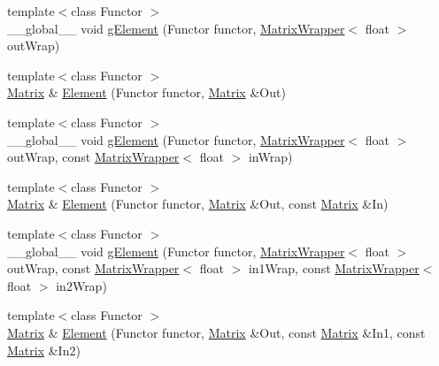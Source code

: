 \begin{DoxyCompactItemize}
\item 
{\footnotesize template$<$class Functor $>$ }\\\+\_\+\+\_\+global\+\_\+\+\_\+ void \hyperlink{namespaceamunmt_1_1GPU_1_1mblas_a2af92dc8b21ca5e91d449759338b8c2c}{g\+Element} (Functor functor, \hyperlink{classamunmt_1_1GPU_1_1mblas_1_1MatrixWrapper}{Matrix\+Wrapper}$<$ float $>$ out\+Wrap)
\item 
{\footnotesize template$<$class Functor $>$ }\\\hyperlink{namespaceamunmt_1_1GPU_1_1mblas_ab67821a8254de53e45a623cf73c0aef6}{Matrix} \& \hyperlink{namespaceamunmt_1_1GPU_1_1mblas_adc0a1bee5e001b28e10bff88e940b284}{Element} (Functor functor, \hyperlink{namespaceamunmt_1_1GPU_1_1mblas_ab67821a8254de53e45a623cf73c0aef6}{Matrix} \&Out)
\item 
{\footnotesize template$<$class Functor $>$ }\\\+\_\+\+\_\+global\+\_\+\+\_\+ void \hyperlink{namespaceamunmt_1_1GPU_1_1mblas_a0712a4ff2aa70bb93b88666856ff3f13}{g\+Element} (Functor functor, \hyperlink{classamunmt_1_1GPU_1_1mblas_1_1MatrixWrapper}{Matrix\+Wrapper}$<$ float $>$ out\+Wrap, const \hyperlink{classamunmt_1_1GPU_1_1mblas_1_1MatrixWrapper}{Matrix\+Wrapper}$<$ float $>$ in\+Wrap)
\item 
{\footnotesize template$<$class Functor $>$ }\\\hyperlink{namespaceamunmt_1_1GPU_1_1mblas_ab67821a8254de53e45a623cf73c0aef6}{Matrix} \& \hyperlink{namespaceamunmt_1_1GPU_1_1mblas_a138142180375dfb251db78a6a377d8fe}{Element} (Functor functor, \hyperlink{namespaceamunmt_1_1GPU_1_1mblas_ab67821a8254de53e45a623cf73c0aef6}{Matrix} \&Out, const \hyperlink{namespaceamunmt_1_1GPU_1_1mblas_ab67821a8254de53e45a623cf73c0aef6}{Matrix} \&In)
\item 
{\footnotesize template$<$class Functor $>$ }\\\+\_\+\+\_\+global\+\_\+\+\_\+ void \hyperlink{namespaceamunmt_1_1GPU_1_1mblas_aa6fb358a30ce9510db093cfce4aa4f7f}{g\+Element} (Functor functor, \hyperlink{classamunmt_1_1GPU_1_1mblas_1_1MatrixWrapper}{Matrix\+Wrapper}$<$ float $>$ out\+Wrap, const \hyperlink{classamunmt_1_1GPU_1_1mblas_1_1MatrixWrapper}{Matrix\+Wrapper}$<$ float $>$ in1\+Wrap, const \hyperlink{classamunmt_1_1GPU_1_1mblas_1_1MatrixWrapper}{Matrix\+Wrapper}$<$ float $>$ in2\+Wrap)
\item 
{\footnotesize template$<$class Functor $>$ }\\\hyperlink{namespaceamunmt_1_1GPU_1_1mblas_ab67821a8254de53e45a623cf73c0aef6}{Matrix} \& \hyperlink{namespaceamunmt_1_1GPU_1_1mblas_ac9aba8feb376d85497281715e31ef4ae}{Element} (Functor functor, \hyperlink{namespaceamunmt_1_1GPU_1_1mblas_ab67821a8254de53e45a623cf73c0aef6}{Matrix} \&Out, const \hyperlink{namespaceamunmt_1_1GPU_1_1mblas_ab67821a8254de53e45a623cf73c0aef6}{Matrix} \&In1, const \hyperlink{namespaceamunmt_1_1GPU_1_1mblas_ab67821a8254de53e45a623cf73c0aef6}{Matrix} \&In2)

\end{DoxyCompactItemize}
